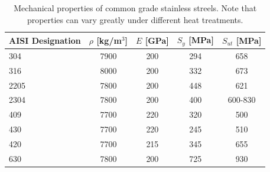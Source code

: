 \documentclass[
10pt,
a4paper,
openany,
svgnames,
]{book}
\begin{document}
\begin{table}[H]
  \centering
  \caption[Mechanical properties of common grade stainless steels]{Mechanical properties of common grade stainless streels. Note that properties can vary greatly under different heat treatments. \cite{davis2000alloy}}
  \label{tab: stainless steel props and uses}
  \begin{tabular}{lcccc}
    \toprule
    AISI Designation & $\rho$ [kg/m$^3$] & $E$ [GPa] & $S_y$ [MPa] & $S_{ut}$ [MPa] \\
    \midrule
    304  & 7900 & 200 & 294 & 658 \\
    316  & 8000 & 200 & 332 & 673 \\
    2205 & 7800 & 200 & 448 & 621 \\
    2304 & 7800 & 200 & 400 & 600-830 \\
    409  & 7700 & 220 & 320 & 500 \\
    430  & 7700 & 220 & 245 & 510 \\
    420  & 7700 & 215 & 345 & 655 \\
    630  & 7800 & 200 & 725 & 930 \\
    \bottomrule
  \end{tabular}
\end{table}
\end{document}
